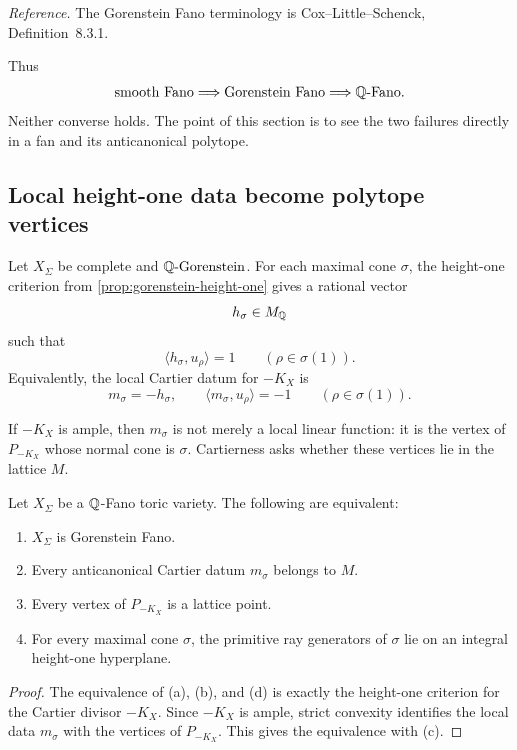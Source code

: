 \noindent
\textit{Reference.}
The Gorenstein Fano terminology is Cox--Little--Schenck,
Definition~8.3.1.

Thus
\[
\text{smooth Fano}
\Longrightarrow
\text{Gorenstein Fano}
\Longrightarrow
\mathbb{Q}\text{-Fano}.
\]
Neither converse holds. The point of this section is to see the two
failures directly in a fan and its anticanonical polytope.

\subsection{Local height-one data become polytope vertices}

Let \(X_\Sigma\) be complete and \(\mathbb{Q}\text{-Gorenstein}\). For each maximal
cone \(\sigma\), the height-one criterion from
\cref{prop:gorenstein-height-one} gives a rational vector
\[
h_\sigma\in M_{\mathbb{Q}}
\]
such that
\[
\langle h_\sigma,u_\rho\rangle=1
\qquad
(\rho\in\sigma(1)).
\]
Equivalently, the local Cartier datum for \(-K_X\) is
\[
m_\sigma=-h_\sigma,
\qquad
\langle m_\sigma,u_\rho\rangle=-1
\qquad
(\rho\in\sigma(1)).
\]

If \(-K_X\) is ample, then \(m_\sigma\) is not merely a local linear
function: it is the vertex of \(P_{-K_X}\) whose normal cone is
\(\sigma\). Cartierness asks whether these vertices lie in the lattice
\(M\).

\begin{proposition}
\label{prop:gorenstein-anticanonical-vertices}
Let \(X_\Sigma\) be a \(\mathbb{Q}\)-Fano toric variety. The following are
equivalent:

\begin{enumerate}[label=(\alph*),wide=0pt]
\item \(X_\Sigma\) is Gorenstein Fano.

\item Every anticanonical Cartier datum \(m_\sigma\) belongs to \(M\).

\item Every vertex of \(P_{-K_X}\) is a lattice point.

\item For every maximal cone \(\sigma\), the primitive ray generators
of \(\sigma\) lie on an integral height-one hyperplane.
\end{enumerate}
\end{proposition}

\begin{proof}
The equivalence of \textup{(a)}, \textup{(b)}, and \textup{(d)} is
exactly the height-one criterion for the Cartier divisor \(-K_X\).
Since \(-K_X\) is ample, strict convexity identifies the local data
\(m_\sigma\) with the vertices of \(P_{-K_X}\). This gives the
equivalence with \textup{(c)}.
\end{proof}


